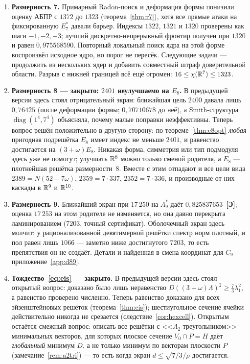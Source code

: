 \begin{enumerate}[leftmargin=1.5em]
\item \textbf{Размерность 7.} Примарный Radon-поиск и деформация формы понизили
оценку АБПР с $1372$ до $1323$ (теорема~\ref{thm:r7}), хотя все прямые атаки на
фиксированную $E_7^*$ давали барьер. Индексы $1322$, $1321$ и $1320$ проверены
как шаги $-1,-2,-3$; лучший дискретно-непрерывный фронтир получен при $1320$
и равен $0{,}975568590$. Повторный локальный поиск ядра на этой форме
воспроизвёл исходное ядро, но порог не пересёк. Следующие задачи --- продолжить
из нескольких ядер и добавить совместный штраф доверительной области. Разрыв с нижней
границей всё ещё огромен: $16\le\chi(\mathbb{R}^7)\le1323$.
\item \textbf{Размерность 8 --- закрыто: $2401$ неулучшаемо на $E_8$.}
В предыдущей версии здесь стоял отрицательный экран: ближайшая цель $2400$
давала лишь $0{,}76425$ (после деформации формы; $0{,}70710678$ до неё), а
Smith-структура $\operatorname{diag}(1^4,7^4)$ объясняла, почему малые поправки
неэффективны. Теперь вопрос решён положительно в другую сторону: по
теореме~\ref{thm:e8opt} \emph{любая} пригодная подрешётка $E_8$ имеет индекс не
меньше $2401$, и равенство достигается на $(3+\omega)E_8$. Никакая форма,
симметрия или тип подмодуля здесь уже не помогут; улучшать $\mathbb{R}^8$ можно только
сменой родителя, а $E_8$ --- плотнейшая решётка размерности~$8$. Вместе с этим
отпадают и все цели вида $2389=N(52+7\omega)$, $2359=7\cdot337$,
$2352=7\cdot336$, и производные от них каскады в $\mathbb{R}^9$ и $\mathbb{R}^{10}$.

\item \textbf{Размерность 9.} Ближайший экран при $17\,250$ на $A_9^*$ даёт
$0{,}825837653$~\textbf{[Э]}; оценка $17\,253$ на этом родителе не изменяется,
но она давно перекрыта ламинированием ($7203$, точный сертификат).
Оболочечный экран здесь молчит: у рационализованной девятимерной решётки спектр
норм плотный, и пол равен лишь $1066$ --- заметно ниже достигнутого $7203$, то
есть препятствия он не создаёт. Детали и найденная в \cite{ABPR} смена
координат для $C_9$ --- приложение~\ref{app:d89}.

\item \textbf{Тождество~\eqref{eq:eis} --- закрыто.} В предыдущей версии здесь
стоял открытый вопрос: доказано было лишь неравенство
$D((3+\omega)\Lambda)^2\ge\tfrac73\lambda_1^2$, а равенство проверено численно.
Теперь равенство доказано для всех эйзенштейновых решёток
(теорема~\ref{thm:eis}); шестиугольное сечение ячейки действительно никогда не
срезается (следствие~\ref{cor:hexcell}). Открытым остаётся смежный вопрос:
описать все решётки с <<$A_2$-треугольником>> минимальных векторов, для которых
плоское сечение $V_0\cap P=H$ даёт \emph{глобальный} минимум $D$, а не только
минимум по векторам плоскости $P$ (замечание~\ref{rem:a2tri}) --- то есть когда
экран $d\le\sqrt{7/3}/\rho$ достигается.


\end{enumerate}
